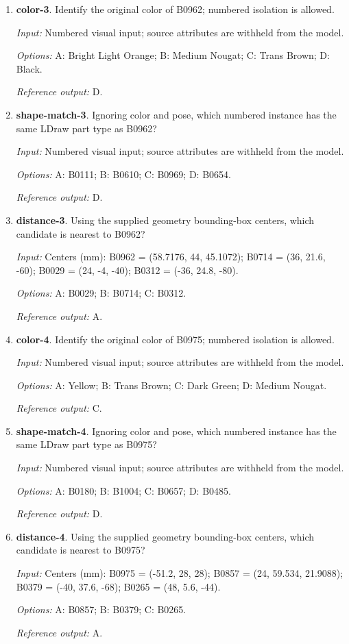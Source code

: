 \begin{enumerate}
\item \textbf{color-3}. Identify the original color of B0962; numbered isolation is allowed.\par {\small \textit{Input:} Numbered visual input; source attributes are withheld from the model. \par\textit{Options:} A: Bright Light Orange; B: Medium Nougat; C: Trans Brown; D: Black. \par\textit{Reference output:} D.}
\item \textbf{shape-match-3}. Ignoring color and pose, which numbered instance has the same LDraw part type as B0962?\par {\small \textit{Input:} Numbered visual input; source attributes are withheld from the model. \par\textit{Options:} A: B0111; B: B0610; C: B0969; D: B0654. \par\textit{Reference output:} D.}
\item \textbf{distance-3}. Using the supplied geometry bounding-box centers, which candidate is nearest to B0962?\par {\small \textit{Input:} Centers (mm): B0962 = (58.7176, 44, 45.1072); B0714 = (36, 21.6, -60); B0029 = (24, -4, -40); B0312 = (-36, 24.8, -80). \par\textit{Options:} A: B0029; B: B0714; C: B0312. \par\textit{Reference output:} A.}
\item \textbf{color-4}. Identify the original color of B0975; numbered isolation is allowed.\par {\small \textit{Input:} Numbered visual input; source attributes are withheld from the model. \par\textit{Options:} A: Yellow; B: Trans Brown; C: Dark Green; D: Medium Nougat. \par\textit{Reference output:} C.}
\item \textbf{shape-match-4}. Ignoring color and pose, which numbered instance has the same LDraw part type as B0975?\par {\small \textit{Input:} Numbered visual input; source attributes are withheld from the model. \par\textit{Options:} A: B0180; B: B1004; C: B0657; D: B0485. \par\textit{Reference output:} D.}
\item \textbf{distance-4}. Using the supplied geometry bounding-box centers, which candidate is nearest to B0975?\par {\small \textit{Input:} Centers (mm): B0975 = (-51.2, 28, 28); B0857 = (24, 59.534, 21.9088); B0379 = (-40, 37.6, -68); B0265 = (48, 5.6, -44). \par\textit{Options:} A: B0857; B: B0379; C: B0265. \par\textit{Reference output:} A.}

\end{enumerate}
